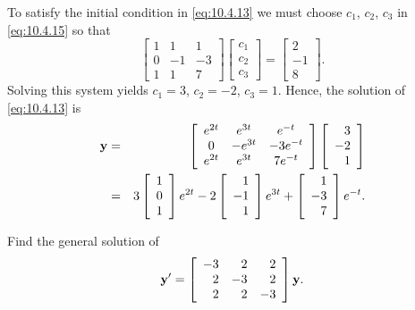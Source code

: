 \begin{examplesolution}
 To satisfy the initial condition in \eqref{eq:10.4.13} we must choose $c_{1}$,
$c_{2}$, $c_{3}$ in \eqref{eq:10.4.15} so that
\[
  \left[
  \begin{array}{rrr}
    1 & 1  & 1  \\
    0 & -1 & -3 \\
    1 & 1  & 7
  \end{array}\right] \left[
  \begin{array}{c}
    c_{1} \\
    c_{2} \\
    c_{3}
  \end{array}\right]= \left[
  \begin{array}{r}
    2  \\
    -1 \\
    8
  \end{array}\right].
\]
Solving this system yields $c_{1}=3$, $c_{2}=-2$, $c_{3}=1$. Hence, the solution of
\eqref{eq:10.4.13} is
\begin{eqnarray*}
  {\bf y}&=&\left[
  \begin{array}{ccc}
    e^{2t} & e^{3t}  & e^{-t}   \\
    0      & -e^{3t} & -3e^{-t} \\
    e^{2t} & e^{3t}  & 7e^{-t}
  \end{array}
  \right] \left[
  \begin{array}{r}
    3  \\
    -2 \\
    1
  \end{array}\right]\\ &=&3\left[
  \begin{array}{r}
    1 \\
    0 \\
    1
  \end{array}\right]e^{2t}-2 \left[
  \begin{array}{r}
    1  \\
    -1 \\
    1
  \end{array}\right] e^{3t}+\left[
  \begin{array}{r}
    1  \\
    -3 \\
    7
  \end{array}
  \right]e^{-t}.
\end{eqnarray*}
\end{examplesolution}

\begin{example}
  \label{example:10.4.3}\rm Find the general solution of
  \begin{equation}
    \label{eq:10.4.16}{\bf y}'=\left[
    \begin{array}{rrr}
      -3 & 2  & 2  \\
      2  & -3 & 2  \\
      2  & 2  & -3
    \end{array}\right]{\bf y}.
  \end{equation}
\end{example}


